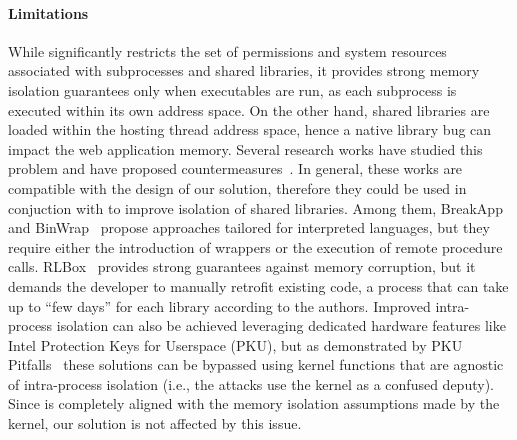   \paragraph{Limitations}
  While \pap significantly restricts the set of permissions and system
  resources associated with subprocesses and shared libraries, it
  provides strong memory isolation guarantees only when executables
  are run, as each subprocess is executed within its own address
  space. On the other hand, shared libraries are loaded within the
  hosting thread address space, hence a native library bug can impact
  the web application memory. Several research works have studied this
  problem and have proposed countermeasures~\cite{RLBox,
    kirth2022pkru, wu2012codejail, cali, vasilakis2018breakapp,
    binwrap}. In general, these works are compatible with the design
  of our solution, therefore they could be used in conjuction with
  \pap to improve isolation of shared libraries. Among them,
  BreakApp~\cite{vasilakis2018breakapp} and BinWrap~\cite{binwrap}
  propose approaches tailored for interpreted languages, but they
  require either the introduction of wrappers or the execution of
  remote procedure calls. RLBox~\cite{RLBox} provides strong
  guarantees against memory corruption, but it demands the developer
  to manually retrofit existing code, a process that can take up to
  ``few days'' for each library according to the authors. Improved
  intra-process isolation can also be achieved leveraging dedicated
  hardware features like Intel Protection Keys for Userspace (PKU),
  but as demonstrated by PKU Pitfalls~\cite{pku-pitfalls} these
  solutions can be bypassed using kernel functions that are agnostic
  of intra-process isolation (i.e., the attacks use the kernel as a
  confused deputy). Since \pap is completely aligned with the memory
  isolation assumptions made by the kernel, our solution is not
  affected by this issue.  




